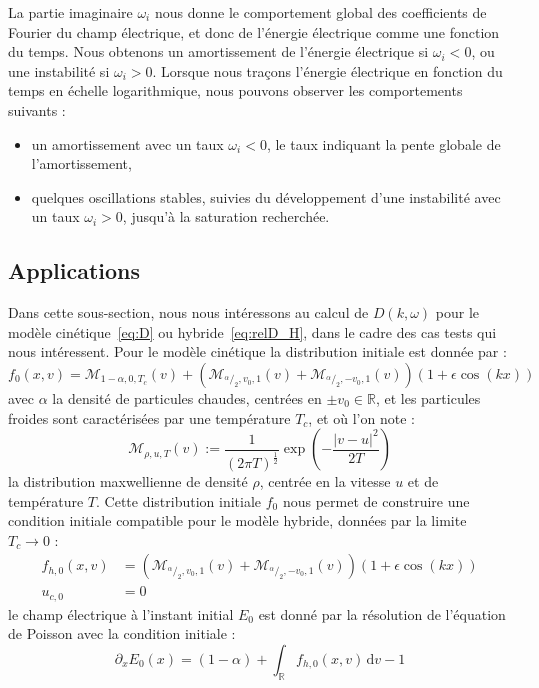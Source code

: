 La partie imaginaire $\omega_i$ nous donne le comportement global des coefficients de Fourier du champ électrique, et donc de l'énergie électrique comme une fonction du temps. Nous obtenons un amortissement de l'énergie électrique si $\omega_i < 0$, ou une instabilité si $\omega_i >0$. Lorsque nous traçons l'énergie électrique en fonction du temps en échelle logarithmique, nous pouvons observer les comportements suivants :
\begin{itemize}
  \item un amortissement avec un taux $\omega_i<0$, le taux indiquant la pente globale de l'amortissement,
  \item quelques oscillations stables, suivies du développement d'une instabilité avec un taux $\omega_i>0$, jusqu'à la saturation recherchée.
\end{itemize}

\subsection{Applications}\label{ssec:disp_appl}

Dans cette sous-section, nous nous intéressons au calcul de $D(k,\omega)$ pour le modèle cinétique~\eqref{eq:D} ou hybride~\eqref{eq:relD_H}, dans le cadre des cas tests qui nous intéressent. Pour le modèle cinétique la distribution initiale est donnée par :
$$
  f_0(x,v) = \mathcal{M}_{1-\alpha,0,T_c}(v)
    + \left(
      \mathcal{M}_{^\alpha/_2,v_0,1}(v) + \mathcal{M}_{^\alpha/_2,-v_0,1}(v)
    \right)(1+\epsilon\cos(kx))
$$
avec $\alpha$ la densité de particules chaudes, centrées en $\pm v_0\in\mathbb{R}$, et les particules froides sont caractérisées par une température $T_c$, et où l'on note :
$$
  \mathcal{M}_{\rho,u,T}(v) := \frac{1}{(2\pi T)^\frac{1}{2}}\exp\left(-\frac{|v-u|^2}{2T}\right)
$$
la distribution maxwellienne de densité $\rho$, centrée en la vitesse $u$ et de température $T$. Cette distribution initiale $f_0$ nous permet de construire une condition initiale compatible pour le modèle hybride, données par la limite $T_c\to 0$ :
\begin{equation}
  \begin{aligned}
    f_{h,0} (x,v) & = \left(
      \mathcal{M}_{^\alpha/_2,v_0,1}(v) + \mathcal{M}_{^\alpha/_2,-v_0,1}(v)
    \right)(1+\epsilon\cos(kx)) \\
    u_{c,0} & = 0
  \end{aligned}
\label{eq:f0hdexv}\end{equation}
le champ électrique à l'instant initial $E_0$ est donné par la résolution de l'équation de Poisson avec la condition initiale :
$$
  \partial_x E_0(x) = (1-\alpha) + \int_\mathbb{R}f_{h,0}(x,v)\,\mathrm{d}v - 1
$$

